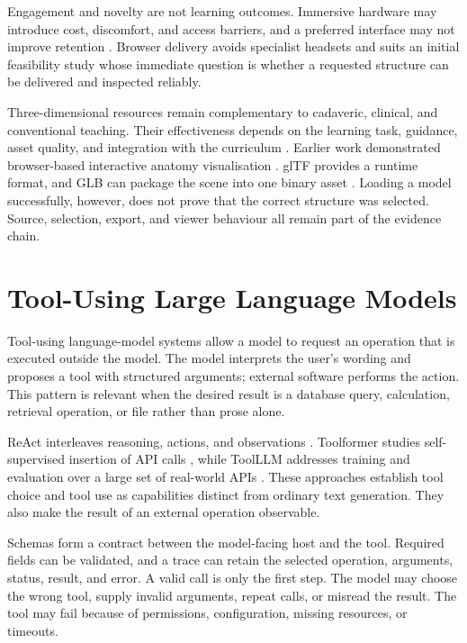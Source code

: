 Engagement and novelty are not learning outcomes. Immersive hardware may introduce cost, discomfort, and access barriers, and a preferred interface may not improve retention \parencite{moro2017,garciarobles2024}. Browser delivery avoids specialist headsets and suits an initial feasibility study whose immediate question is whether a requested structure can be delivered and inspected reliably.

Three-dimensional resources remain complementary to cadaveric, clinical, and conventional teaching. Their effectiveness depends on the learning task, guidance, asset quality, and integration with the curriculum \parencite{yammine2015,moro2017,garciarobles2024}. Earlier work demonstrated browser-based interactive anatomy visualisation \parencite{petersson2009}. glTF provides a runtime format, and GLB can package the scene into one binary asset \parencite{khronosGltf}. Loading a model successfully, however, does not prove that the correct structure was selected. Source, selection, export, and viewer behaviour all remain part of the evidence chain.

\section{Tool-Using Large Language Models}
\label{sec:tool-using-llms}

Tool-using language-model systems allow a model to request an operation that is executed outside the model. The model interprets the user's wording and proposes a tool with structured arguments; external software performs the action. This pattern is relevant when the desired result is a database query, calculation, retrieval operation, or file rather than prose alone.

ReAct interleaves reasoning, actions, and observations \parencite{yao2023react}. Toolformer studies self-supervised insertion of API calls \parencite{schick2023toolformer}, while ToolLLM addresses training and evaluation over a large set of real-world APIs \parencite{qin2024toolllm}. These approaches establish tool choice and tool use as capabilities distinct from ordinary text generation. They also make the result of an external operation observable.

Schemas form a contract between the model-facing host and the tool. Required fields can be validated, and a trace can retain the selected operation, arguments, status, result, and error. A valid call is only the first step. The model may choose the wrong tool, supply invalid arguments, repeat calls, or misread the result. The tool may fail because of permissions, configuration, missing resources, or timeouts.

